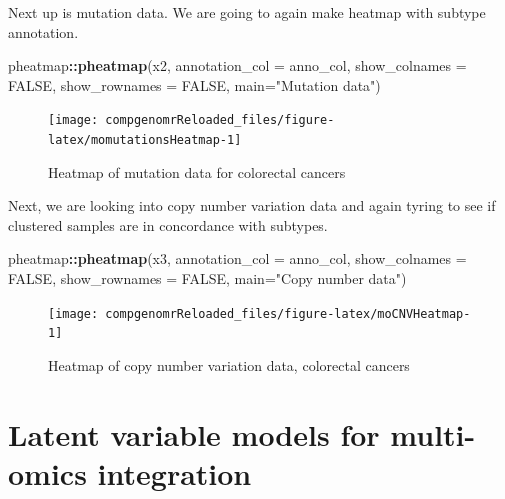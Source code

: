 \documentclass[12pt,]{krantz}
\newenvironment{Shaded}{\begin{snugshade}}{\end{snugshade}}
\newcommand{\DataTypeTok}[1]{\textcolor[rgb]{0.13,0.29,0.53}{#1}}
\newcommand{\KeywordTok}[1]{\textcolor[rgb]{0.13,0.29,0.53}{\textbf{#1}}}
\newcommand{\NormalTok}[1]{#1}
\newcommand{\OperatorTok}[1]{\textcolor[rgb]{0.81,0.36,0.00}{\textbf{#1}}}
\newcommand{\OtherTok}[1]{\textcolor[rgb]{0.56,0.35,0.01}{#1}}
\newcommand{\StringTok}[1]{\textcolor[rgb]{0.31,0.60,0.02}{#1}}
\begin{document}
Next up is mutation data. We are going to again make heatmap with subtype annotation.

\begin{Shaded}
\begin{Highlighting}[]
\NormalTok{pheatmap}\OperatorTok{::}\KeywordTok{pheatmap}\NormalTok{(x2,}
                   \DataTypeTok{annotation_col =}\NormalTok{ anno_col,}
                   \DataTypeTok{show_colnames =} \OtherTok{FALSE}\NormalTok{,}
                   \DataTypeTok{show_rownames =} \OtherTok{FALSE}\NormalTok{,}
                   \DataTypeTok{main=}\StringTok{"Mutation data"}\NormalTok{)}
\end{Highlighting}
\end{Shaded}

\begin{figure}

{\centering \texttt{[image: compgenomrReloaded\_files/figure-latex/momutationsHeatmap-1]} 

}

\caption{Heatmap of mutation data for colorectal cancers}\label{fig:momutationsHeatmap}
\end{figure}

Next, we are looking into copy number variation data and again tyring to see if clustered samples are in concordance with subtypes.

\begin{Shaded}
\begin{Highlighting}[]
\NormalTok{pheatmap}\OperatorTok{::}\KeywordTok{pheatmap}\NormalTok{(x3,}
                   \DataTypeTok{annotation_col =}\NormalTok{ anno_col,}
                   \DataTypeTok{show_colnames =} \OtherTok{FALSE}\NormalTok{,}
                   \DataTypeTok{show_rownames =} \OtherTok{FALSE}\NormalTok{,}
                   \DataTypeTok{main=}\StringTok{"Copy number data"}\NormalTok{)}
\end{Highlighting}
\end{Shaded}

\begin{figure}

{\centering \texttt{[image: compgenomrReloaded\_files/figure-latex/moCNVHeatmap-1]} 

}

\caption{Heatmap of copy number variation data, colorectal cancers}\label{fig:moCNVHeatmap}
\end{figure}

\hypertarget{latent-variable-models-for-multi-omics-integration}{%
\section{Latent variable models for multi-omics integration}\label{latent-variable-models-for-multi-omics-integration}}
\end{document}
